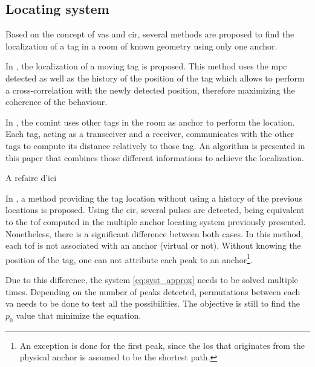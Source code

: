 \subsection{Locating system}
\label{loc_syst_mpc}

Based on the concept of \glspl{va} and \gls{cir}, several methods are proposed to find the localization of a tag in a room of known geometry using only one anchor.
\vspace{2mm}

In \cite{meissner2010mc}, the localization of a moving tag is proposed. This method uses the \gls{mpc} detected as well as the history of the position of the tag which allows to perform a cross-correlation with the newly detected position, therefore maximizing the coherence of the behaviour.
\vspace{2mm}

In \cite{froehle2013cooperative}, the \gls{comint} uses other tags in the room as anchor to perform the location. Each tag, acting as a transceiver and a receiver, communicates with the other tags to compute its distance relatively to those tag. An algorithm is presented in this paper that combines those different informations to achieve the localization.
\vspace{2mm}

\color{red} A refaire d'ici \color{black}

In \cite{jespersen2018indoor}, a method providing the tag location without using a history of the previous locations is proposed. Using the \gls{cir}, several pulses are detected, being equivalent to the \gls{tof} computed in the multiple anchor locating system previously presented. Nonetheless, there is a significant difference between both cases. In this method, each \gls{tof} is not associated with an anchor (virtual or not). Without knowing the position of the tag, one can not attribute each peak to an anchor\footnote{An exception is done for the first peak, since the \gls{los} that originates from the physical anchor is assumed to be the shortest path.}.
\vspace{2mm}

Due to this difference, the system \ref{eq:syst_approx} needs to be solved multiple times. Depending on the number of peaks detected, permutations between each \gls{va} needs to be done to test all the possibilities. The objective is still to find the $p_0$ value that minimize the equation.




